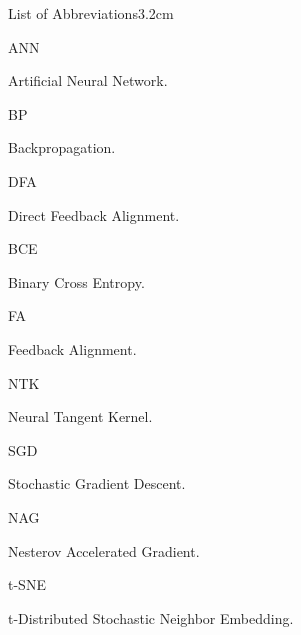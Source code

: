 \documentclass[a4paper, nobind]{templates/ociamthesis}
\begin{document}
\begin{romanpages}
  \dominitoc %

\flushbottom

\tableofcontents

\listoffigures
	\mtcaddchapter

\begin{mclistof}{List of Abbreviations}{3.2cm}

\item[ANN]

Artificial Neural Network.

\item[BP]

Backpropagation.

\item[DFA]

Direct Feedback Alignment.

\item[BCE]

Binary Cross Entropy.

\item[FA]

Feedback Alignment.

\item[NTK]

Neural Tangent Kernel.

\item[SGD]

Stochastic Gradient Descent.

\item[NAG]

Nesterov Accelerated Gradient.

\item[t-SNE]

t-Distributed Stochastic Neighbor Embedding.

\end{mclistof} 


\end{romanpages}
\end{document}
